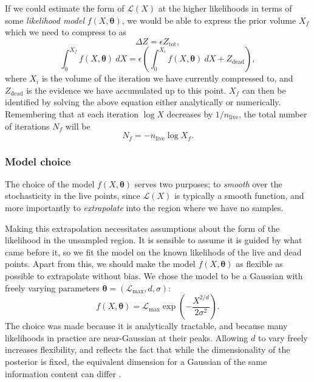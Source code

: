 \documentclass[usenatbib]{mnras} %
\newcommand{\thetab}{\bm{\theta}}
\newcommand{\nlive}{n_\mathrm{live}}
\newcommand{\Like}{\mathcal{L}}
\begin{document}
\par
If we could estimate the form of $\Like(X)$ at the higher likelihoods in terms of some \textit{likelihood model} $f(X, \thetab)$, we would be able to express the prior volume $X_f$ which we need to compress to as
\begin{equation}
	\Delta Z = \epsilon Z_\mathrm{tot},
\end{equation}
\begin{equation}\label{model endpoint}
	\int_0^{X_f} f(X, \thetab)\ dX = \epsilon \left( \int_0^{X_i} f(X, \thetab)\ dX + Z_\mathrm{dead} \right),
\end{equation}
where $X_i$ is the volume of the iteration we have currently compressed to, and $Z_\mathrm{dead}$ is the evidence we have accumulated up to this point. $X_f$ can then be identified by solving the above equation either analytically or numerically. Remembering that at each iteration $\log X$ decreases by $1/\nlive$, the total number of iterations $N_f$ will be
\begin{equation}
	N_f = - \nlive \log X_f .
\end{equation}

\subsubsection{Model choice}\label{sec:Model choice}
The choice of the model $f(X, \thetab)$ serves two purposes; to \textit{smooth} over the stochasticity in the live points, since $\Like(X)$ is typically a smooth function, and more importantly to \textit{extrapolate} into the region where we have no samples.
\par
Making this extrapolation necessitates assumptions about the form of the likelihood in the unsampled region. It is sensible to assume it is guided by what came before it, so we fit the model on the known likelihods of the live and dead points. Apart from this, we should make the model $f(X, \thetab)$ as flexible as possible to extrapolate without bias. We chose the model to be a Gaussian with freely varying parameters $\thetab = (\Like_\mathrm{max}, d, \sigma)$:
\begin{equation}
	f(X, \thetab) = \Like_\mathrm{max} \exp\left(-\frac{X^{2/d}}{2\sigma^2}\right).
\end{equation}
The choice was made because it is analytically tractable, and because many likelihoods in practice are near-Gaussian at their peaks. Allowing $d$ to vary freely increases flexibility, and reflects the fact that while the dimensionality of the posterior is fixed, the equivalent dimension for a Gaussian of the same information content can differ \citep{Handley_2019}.
\end{document}
